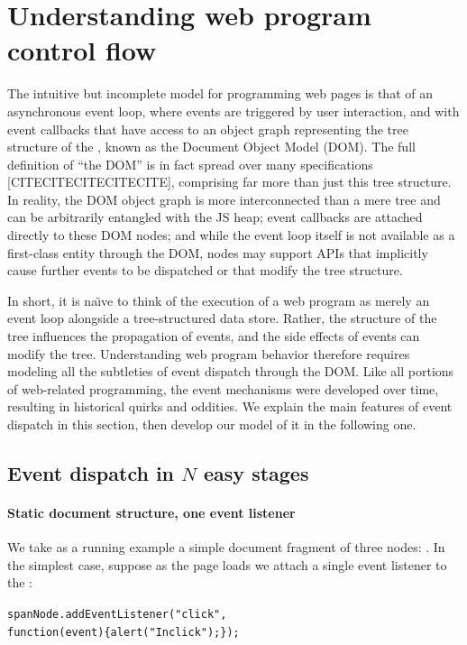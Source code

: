 \documentclass[letterpaper,10pt,twocolumn]{article}
\makeatletter
\DeclareRobustCommand{\spec}[1]{\textsf{#1}\xspace}
\DeclareRobustCommand\JS{\spec{JS}}
\DeclareRobustCommand\HTML{\@ifnextchar4{\HTMLFour}{\@ifnextchar5{\HTMLFive}{\spec{HTML}}}}
\DeclareRobustCommand\HTMLFive[1]{\spec{HTML\,5}}
\DeclareRobustCommand\HTMLFour[1]{\@ifnextchar.{\HTMLFourDot}{\spec{HTML\,4}}}
\DeclareRobustCommand\HTMLFourDot[1]{\@ifnextchar0{\HTMLFourDotOh}{\spec{HTML\,4}.}}
\DeclareRobustCommand\HTMLFourDotOh[1]{\@ifnextchar1{\HTMLFourDotOhOne}{\spec{HTML\,4.0}}}
\DeclareRobustCommand\HTMLFourDotOhOne[1]{\spec{HTML\,4.01}}
\makeatother
\begin{document}
\section{Understanding web program control flow}\label{sec:c3-architecture}
The intuitive but incomplete model for programming web pages is that
of an asynchronous event loop, where events are triggered by user
interaction, and with event callbacks that have access to an object
graph representing the tree structure of the \HTML, known as the
Document Object Model (DOM).  The full definition of ``the DOM'' is in
fact spread over many specifications [CITECITECITECITECITE],
comprising far more than just this tree structure.  In reality, the
DOM object graph is more interconnected than a mere tree and can be
arbitrarily entangled with the \JS heap; event callbacks are attached
directly to these DOM nodes; and while the event loop itself is not
available as a first-class entity through the DOM, nodes may support
APIs that implicitly cause further events to be dispatched or that
modify the tree structure.

In short, it is na\"{\i}ve to think of the execution of a web program
as merely an event loop alongside a tree-structured data store.
Rather, the structure of the tree influences the propagation of
events, and the side effects of events can modify the tree.
Understanding web program behavior therefore requires modeling all the
subtleties of event dispatch through the DOM.  Like all portions of
web-related programming, the event mechanisms were developed over
time, resulting in historical quirks and oddities.  We explain the
main features of event dispatch in this section, then develop our
model of it in the following one.

\subsection{Event dispatch in $N$ easy stages}
\paragraph{Static document structure, one event listener}
We take as a running example a simple document fragment of three
nodes: .  In the simplest case,
suppose as the page loads we attach a single event listener to the
:
\begin{alltt}
  spanNode.addEventListener("click",
    function(event) \{ alert("In click"); \});
\end{alltt}
\end{document}
